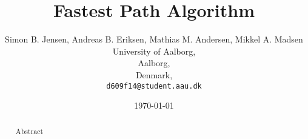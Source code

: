 \documentclass[a4paper,12pt, twocolumn]{article}
\begin{document}
\title{Fastest Path Algorithm}
\author{Simon B. Jensen, Andreas B. Eriksen, Mathias M. Andersen, Mikkel A. Madsen\\
  University of Aalborg,\\
  Aalborg,\\
  Denmark,\\
  \texttt{d609f14@student.aau.dk}}
\date{\today}
\maketitle

\begin{abstract}
Abstract
\end{abstract}








\end{document}
